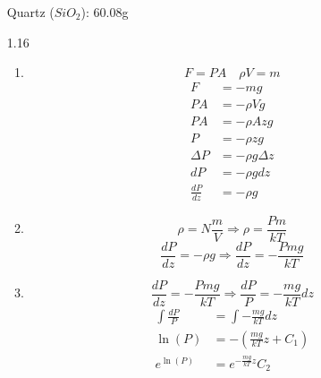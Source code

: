 \documentclass{article}
\begin{document}
\begin{enumerate}
    Quartz (\(SiO_2\)): 60.08g
    \vspace{0.1in}
    \item [1.16]
    \begin{enumerate}
        \item
            \begin{equation*}
                F = PA \quad \rho V = m    
            \end{equation*}
            \begin{align*}
                F &= -mg \\
                PA &= - \rho Vg \\
                PA &= - \rho Azg \\
                P &= - \rho zg \\
                \Delta P &= - \rho g \Delta z \\
                dP &= - \rho g dz \\
                \frac{dP}{dz} &= - \rho g
            \end{align*}
        \vspace{0.05in}
        \item
            \begin{equation*}
                \rho = N \frac{m}{V} \Rightarrow \rho = \frac{Pm}{kT}
            \end{equation*}
            \begin{equation*}
                \frac{dP}{dz} = - \rho g \Rightarrow \frac{dP}{dz} = - \frac{Pmg}{kT}
            \end{equation*}
        \vspace{0.05in}
        \item
            \begin{equation*}
                \frac{dP}{dz} = - \frac{Pmg}{kT} \Rightarrow \frac{dP}{P} = - \frac{mg}{kT} dz
            \end{equation*}
            \begin{align*}
                \int \frac{dP}{P} &= \int - \frac{mg}{kT} dz \\
                \ln (P) &= - \left(\frac{mg}{kT} z + C_1 \right) \\
                e^{\ln (P)} &= e^{- \frac{mg}{kT}z} C_2 \\

\end{align*}
\end{enumerate}
\end{enumerate}
\end{document}
